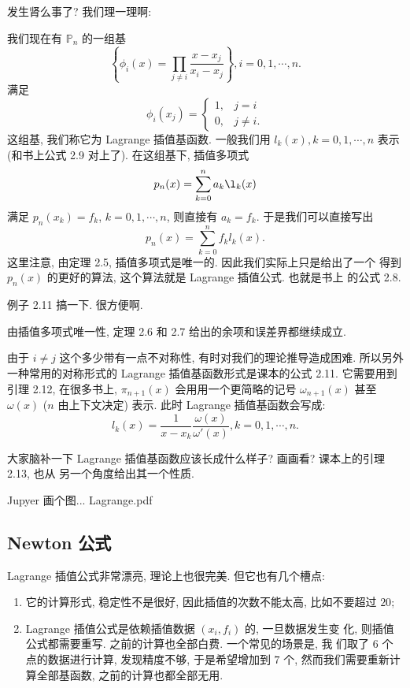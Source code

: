 \documentclass[a4paper]{ctexart}
\newcommand{\remark}[1]
{\noindent {\bf Remark {#1}}}
\begin{document}
发生肾么事了? 我们理一理啊:

我们现在有 $\mathbb{P}_n$ 的一组基
$$
\left\{\phi_i(x) = \prod_{j \neq i}\frac{x - x_j}{x_i - x_j}
\right\}, i = 0, 1, \cdots, n.
$$
满足
$$
\phi_i(x_j) = \left\{
\begin{array}{ll}
  1,& j = i \\
  0,& j \neq i.
\end{array}
\right.
$$
这组基, 我们称它为 Lagrange 插值基函数. 一般我们用 $l_k(x), k = 0, 1, \cdots, n$
表示(和书上公式 2.9 对上了). 在这组基下, 插值多项式
$$
p_n(x) = \sum_{k = 0}^n a_k \l_k(x)
$$
满足 $p_n(x_k) = f_k$, $k = 0, 1, \cdots, n$,
则直接有 $a_k = f_k$. 于是我们可以直接写出
$$
p_n(x) = \sum_{k = 0}^n f_k l_k(x).
$$
这里注意, 由定理 2.5, 插值多项式是唯一的. 因此我们实际上只是给出了一个
得到 $p_n(x)$ 的更好的算法, 这个算法就是 Lagrange 插值公式. 也就是书上
的公式 2.8.

例子 2.11 搞一下. 很方便啊.

由插值多项式唯一性, 定理 2.6 和 2.7 给出的余项和误差界都继续成立.

由于 $i \neq j$ 这个多少带有一点不对称性, 有时对我们的理论推导造成困难.
所以另外一种常用的对称形式的 Lagrange 插值基函数形式是课本的公式 2.11.
它需要用到引理 2.12, 在很多书上, $\pi_{n + 1}(x)$ 会用用一个更简略的记号
$\omega_{n + 1}(x)$ 甚至 $\omega(x)$ ($n$ 由上下文决定) 表示. 此时
Lagrange 插值基函数会写成:
$$
l_k(x) = \frac{1}{x - x_k}\frac{\omega(x)}{\omega'(x)}, k = 0, 1, \cdots, n.
$$

大家脑补一下 Lagrange 插值基函数应该长成什么样子? 画画看? 课本上的引理 2.13, 也从
另一个角度给出其一个性质. 

Jupyer 画个图... Lagrange.pdf

\subsection{Newton 公式}

\remark{2.8} Lagrange 插值公式非常漂亮, 理论上也很完美. 但它也有几个槽点:

\begin{enumerate}
\item 它的计算形式, 稳定性不是很好, 因此插值的次数不能太高, 比如不要超过 $20$;
\item Lagrange 插值公式是依赖插值数据 $(x_i, f_i)$ 的, 一旦数据发生变
  化, 则插值公式都需要重写. 之前的计算也全部白费. 一个常见的场景是, 我
  们取了 $6$ 个点的数据进行计算, 发现精度不够, 于是希望增加到 $7$ 个,
  然而我们需要重新计算全部基函数, 之前的计算也都全部无用. 
\end{enumerate}
\end{document}
